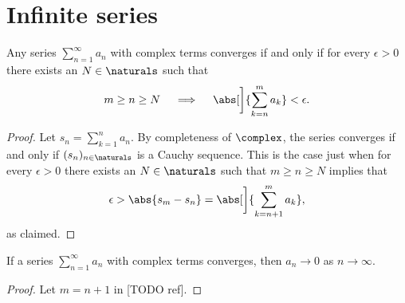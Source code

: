 \documentclass[article, a4paper, 11pt, oneside]{memoir}
\numberwithin{equation}{chapter}
\begin{document}


\section{Infinite series}

\begin{proposition}
    Any series $\sum_{n=1}^\infty a_n$ with complex terms converges if and only if for every $\epsilon > 0$ there exists an $N \in \naturals$ such that
    \begin{equation*}
        m \geq n \geq N
        \quad \implies \quad
        \abs[\bigg]{ \sum_{k=n}^m a_k } < \epsilon.
    \end{equation*}
\end{proposition}

\begin{proof}
    Let $s_n = \sum_{k=1}^n a_n$. By completeness of $\complex$, the series converges if and only if $(s_n)_{n \in \naturals}$ is a Cauchy sequence. This is the case just when for every $\epsilon > 0$ there exists an $N \in \naturals$ such that $m \geq n \geq N$ implies that
    \begin{equation*}
        \epsilon
            > \abs{s_m - s_n}
            = \abs[\bigg]{ \sum_{k=n+1}^m a_k },
    \end{equation*}
    as claimed.
\end{proof}


\begin{corollary}
    If a series $\sum_{n=1}^\infty a_n$ with complex terms converges, then $a_n \to 0$ as $n \to \infty$.
\end{corollary}

\begin{proof}
    Let $m = n + 1$ in [TODO ref].
\end{proof}
\end{document}
